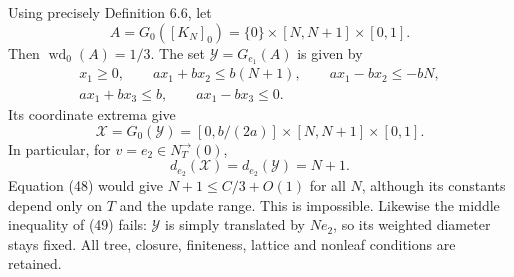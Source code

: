 \documentclass[10pt]{article}
\begin{document}
Using precisely Definition 6.6, let \[A=G_0([K_N]_0)=\{0\}\times[N,N+1]\times[0,1].\] Then \(\operatorname{wd}_0(A)=1/3\). The set \(\mathcal Y=G_{e_1}(A)\) is given by \[\begin{gathered}
 x_1\ge0,\qquad ax_1+bx_2\le b(N+1),\qquad
 ax_1-bx_2\le-bN,\\
 ax_1+bx_3\le b,\qquad ax_1-bx_3\le0.
 \end{gathered}\] Its coordinate extrema give \[\mathcal X=G_0(\mathcal Y)
 =[0,b/(2a)]\times[N,N+1]\times[0,1].\] In particular, for \(v=e_2\in N_T^\to(0)\), \[d_{e_2}(\mathcal X)=d_{e_2}(\mathcal Y)=N+1.\] Equation (48) would give \(N+1\le C/3+O(1)\) for all \(N\), although its constants depend only on \(T\) and the update range. This is impossible. Likewise the middle inequality of (49) fails: \(\mathcal Y\) is simply translated by \(Ne_2\), so its weighted diameter stays fixed. All tree, closure, finiteness, lattice and nonleaf conditions are retained.\par
\end{document}

